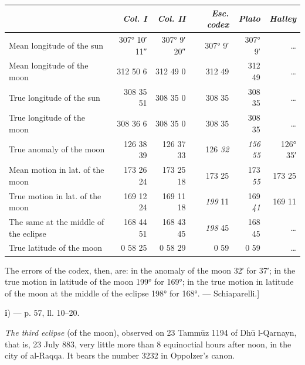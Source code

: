 \documentclass[11pt]{article}
\newcommand{\Pg}[1]{\marginpar{\footnotesize\color{gray}#1}}
\begin{document}
\begin{center}\small\begin{tabular}{>{\raggedright\arraybackslash}p{50mm}rrrrr}
 & \emph{Col. I} & \emph{Col. II} & \emph{Esc. codex} & \emph{Plato} & \emph{Halley} \\
\midrule
Mean longitude of the sun & 307° 10′ 11″ & 307° 9′ 20″ & 307° 9′ & 307° 9′ & … \\
Mean longitude of the moon & 312 50 6 & 312 49 0 & 312 49 & 312 49 & … \\
True longitude of the sun & 308 35 51 & 308 35 0 & 308 35 & 308 35 & … \\
True longitude of the moon & 308 36 6 & 308 35 0 & 308 35 & 308 35 & … \\
True anomaly of the moon & 126 38 39 & 126 37 33 & 126 \emph{32} & \emph{156} \emph{55} & 126° 35′ \\
Mean motion in lat. of the moon & 173 26 24 & 173 25 18 & 173 25 & 173 \emph{55} & 173 25 \\
True motion in lat. of the moon & 169 12 24 & 169 11 18 & \emph{199} 11 & 169 \emph{41} & 169 11 \\
The same at the middle of the eclipse & 168 44 51 & 168 43 45 & \emph{198} 45 & 168 45 & … \\
True latitude of the moon & 0 58 25 & 0 58 29 & 0 59 & 0 59 & … \\
\end{tabular}\end{center}
\par The errors of the codex, then, are: in the anomaly of the moon  32′ for  37′; in the true motion in latitude of the moon  199° for  169°; in the true motion in latitude of the moon at the middle of the eclipse  198° for  168°. — Schiaparelli.]\par
\par\begin{center}\Pg{I 230}\textbf{i}) — p. 57, ll. 10–20.\end{center}
\par \emph{The third eclipse} (of the moon), observed on 23 Tammūz 1194 of Dhū l-Qarnayn, that is, 23 July 883, very little more than 8 equinoctial hours after noon, in the city of al-Raqqa. It bears the number 3232 in Oppolzer's canon.\par
\end{document}
